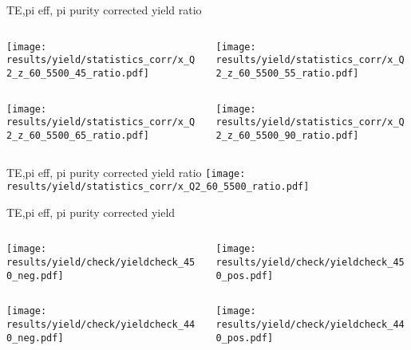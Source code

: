 \begin{frame}{TE,pi eff, pi purity corrected yield ratio}
\begin{columns}
\begin{column}[T]{0.5\textwidth}
\texttt{[image: results/yield/statistics\_corr/x\_Q2\_z\_60\_5500\_45\_ratio.pdf]}
\end{column}
\begin{column}[T]{0.5\textwidth}
\texttt{[image: results/yield/statistics\_corr/x\_Q2\_z\_60\_5500\_55\_ratio.pdf]}
\end{column}
\end{columns}
\begin{columns}
\begin{column}[T]{0.5\textwidth}
\texttt{[image: results/yield/statistics\_corr/x\_Q2\_z\_60\_5500\_65\_ratio.pdf]}
\end{column}
\begin{column}[T]{0.5\textwidth}
\texttt{[image: results/yield/statistics\_corr/x\_Q2\_z\_60\_5500\_90\_ratio.pdf]}
\end{column}
\end{columns}
\end{frame}
\begin{frame}{TE,pi eff, pi purity corrected yield ratio}
\texttt{[image: results/yield/statistics\_corr/x\_Q2\_60\_5500\_ratio.pdf]}
\end{frame}
\begin{frame}{TE,pi eff, pi purity corrected yield}
\begin{columns}
\begin{column}[T]{0.5\textwidth}
\texttt{[image: results/yield/check/yieldcheck\_450\_neg.pdf]}
\end{column}
\begin{column}[T]{0.5\textwidth}
\texttt{[image: results/yield/check/yieldcheck\_450\_pos.pdf]}
\end{column}
\end{columns}
\begin{columns}
\begin{column}[T]{0.5\textwidth}
\texttt{[image: results/yield/check/yieldcheck\_440\_neg.pdf]}
\end{column}
\begin{column}[T]{0.5\textwidth}
\texttt{[image: results/yield/check/yieldcheck\_440\_pos.pdf]}
\end{column}
\end{columns}
\end{frame}
